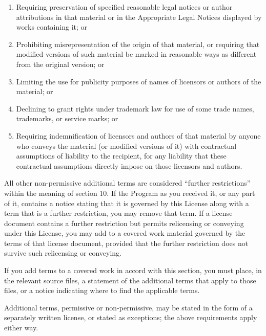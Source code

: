 \documentclass{article}
\begin{document}
\begin{enumerate}
\begin{enumerate}
      \item Requiring preservation of specified reasonable legal notices or
      author attributions in that material or in the Appropriate Legal
      Notices displayed by works containing it; or
    
      \item Prohibiting misrepresentation of the origin of that material, or
      requiring that modified versions of such material be marked in
      reasonable ways as different from the original version; or
    
      \item Limiting the use for publicity purposes of names of licensors or
      authors of the material; or
    
      \item Declining to grant rights under trademark law for use of some
      trade names, trademarks, or service marks; or
    
      \item Requiring indemnification of licensors and authors of that
      material by anyone who conveys the material (or modified versions of
      it) with contractual assumptions of liability to the recipient, for
      any liability that these contractual assumptions directly impose on
      those licensors and authors.
      \end{enumerate}
    
    All other non-permissive additional terms are considered ``further
    restrictions'' within the meaning of section 10.  If the Program as you
    received it, or any part of it, contains a notice stating that it is
    governed by this License along with a term that is a further
    restriction, you may remove that term.  If a license document contains
    a further restriction but permits relicensing or conveying under this
    License, you may add to a covered work material governed by the terms
    of that license document, provided that the further restriction does
    not survive such relicensing or conveying.
    
    If you add terms to a covered work in accord with this section, you
    must place, in the relevant source files, a statement of the
    additional terms that apply to those files, or a notice indicating
    where to find the applicable terms.
    
    Additional terms, permissive or non-permissive, may be stated in the
    form of a separately written license, or stated as exceptions;
    the above requirements apply either way.
    

\end{enumerate}
\end{document}
